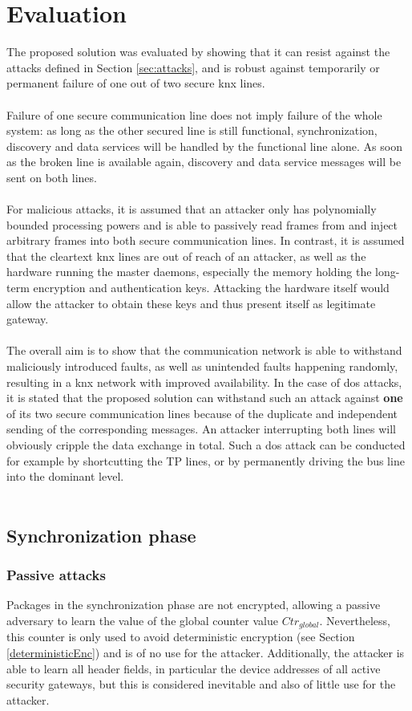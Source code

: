 \section{Evaluation}
The proposed solution was evaluated by showing that it can resist against the attacks defined in Section \ref{sec:attacks}, and is robust against temporarily or permanent 
failure of one out of two secure \gls{knx} lines.
\\
\\
Failure of one secure communication line does not imply failure of the whole system: as long as the other secured line is still functional, synchronization, discovery and data services
will be handled by the functional line alone. As soon as the broken line is available again, discovery and data service messages will be sent on both lines.
\\
\\
For malicious attacks, it is assumed that an attacker only has polynomially bounded processing
powers and is able to passively read frames from and inject arbitrary frames into both secure communication lines. In contrast, it is assumed that the cleartext \gls{knx} lines are out 
of reach of an attacker, as well as the hardware running the master daemons, especially the memory holding the long-term encryption and authentication keys. Attacking the hardware
itself would allow the attacker to obtain these keys and thus present itself as legitimate gateway.
\\
\\
The overall aim is to show that the communication network is able to withstand maliciously introduced faults, as well as unintended faults happening randomly, resulting
in a \gls{knx} network with improved availability. In the case of \gls{dos} attacks, it is stated that the proposed solution can withstand such an attack against \textbf{one} of its
two secure communication lines because of the duplicate and independent sending of the corresponding messages. An attacker interrupting both lines will obviously cripple the 
data exchange in total. Such a \gls{dos} attack can be conducted for example by shortcutting the \gls{TP} lines, or by permanently driving the bus line into the dominant level.
\\
\\
\subsection{Synchronization phase}
\subsubsection{Passive attacks}
Packages in the synchronization phase are not encrypted, allowing a passive adversary to learn the value of the global counter value $Ctr_{global}$. Nevertheless,
this counter is only used to avoid deterministic encryption (see Section \ref{deterministicEnc}) and is of no use for the attacker.
Additionally, the attacker is able to learn all header fields, in particular the device addresses of all active security gateways, but this is considered inevitable and also of little
use for the attacker.

